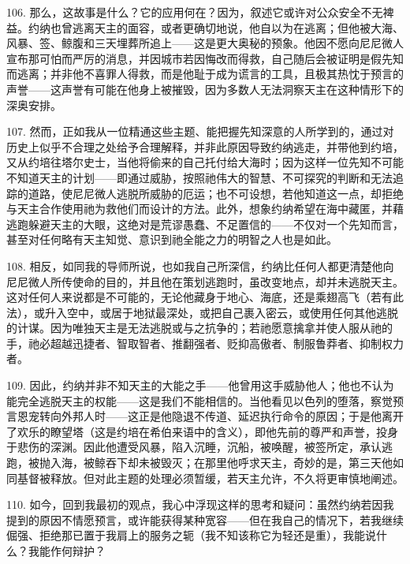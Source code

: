 106. 那么，这故事是什么？它的应用何在？因为，叙述它或许对公众安全不无裨益。约纳也曾逃离天主的面容，或者更确切地说，他自以为在逃离；但他被大海、风暴、签、鲸腹和三天埋葬所追上——这是更大奥秘的预象。他因不愿向尼尼微人宣布那可怕而严厉的消息，并因城市若因悔改而得救，自己随后会被证明是假先知而逃离；并非他不喜罪人得救，而是他耻于成为谎言的工具，且极其热忱于预言的声誉——这声誉有可能在他身上被摧毁，因为多数人无法洞察天主在这种情形下的深奥安排。\par

107. 然而，正如我从一位精通这些主题、能把握先知深意的人所学到的，通过对历史上似乎不合理之处给予合理解释，并非此原因导致约纳逃走，并带他到约培，又从约培往塔尔史士，当他将偷来的自己托付给大海时；因为这样一位先知不可能不知道天主的计划——即通过威胁，按照祂伟大的智慧、不可探究的判断和无法追踪的道路，使尼尼微人逃脱所威胁的厄运；也不可设想，若他知道这一点，却拒绝与天主合作使用祂为救他们而设计的方法。此外，想象约纳希望在海中藏匿，并藉逃跑躲避天主的大眼，这绝对是荒谬愚蠢、不足置信的——不仅对一个先知而言，甚至对任何略有天主知觉、意识到祂全能之力的明智之人也是如此。\par

108. 相反，如同我的导师所说，也如我自己所深信，约纳比任何人都更清楚他向尼尼微人所传使命的目的，并且他在策划逃跑时，虽改变地点，却并未逃脱天主。这对任何人来说都是不可能的，无论他藏身于地心、海底，还是乘翅高飞（若有此法），或升入空中，或居于地狱最深处，或把自己裹入密云，或使用任何其他逃脱的计谋。因为唯独天主是无法逃脱或与之抗争的；若祂愿意擒拿并使人服从祂的手，祂必超越迅捷者、智取智者、推翻强者、贬抑高傲者、制服鲁莽者、抑制权力者。\par

109. 因此，约纳并非不知天主的大能之手——他曾用这手威胁他人；他也不认为能完全逃脱天主的权能——这是我们不能相信的。当他看见以色列的堕落，察觉预言恩宠转向外邦人时——这正是他隐退不传道、延迟执行命令的原因；于是他离开了欢乐的瞭望塔（这是约培在希伯来语中的含义），即他先前的尊严和声誉，投身于悲伤的深渊。因此他遭受风暴，陷入沉睡，沉船，被唤醒，被签所定，承认逃跑，被抛入海，被鲸吞下却未被毁灭；在那里他呼求天主，奇妙的是，第三天他如同基督被释放。但对此主题的处理必须暂缓，若天主允许，不久将更审慎地阐述。\par

110. 如今，回到我最初的观点，我心中浮现这样的思考和疑问：虽然约纳若因我提到的原因不情愿预言，或许能获得某种宽容——但在我自己的情况下，若我继续倔强、拒绝那已置于我肩上的服务之轭（我不知该称它为轻还是重），我能说什么？我能作何辩护？\par

